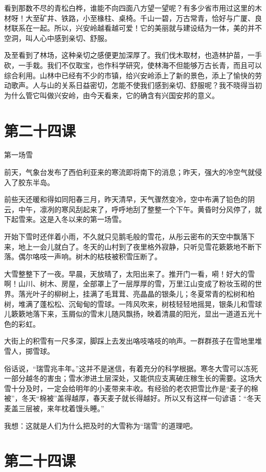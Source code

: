 \documentclass[12pt,UTF8]{ctexbook}
\begin{document}
看到那数不尽的青松白桦，谁能不向四面八方望一望呢？有多少省市用过这里的木材呀！大至矿井、铁路，小至椽柱、桌椅。千山一碧，万古常青，恰好与广厦、良材联系在一起。所以，兴安岭越看越可爱！它的美丽就与建设结为一体，美的并不空洞，叫人心中感到亲切、舒服。

及至看到了林场，这种亲切之感便更加深厚了。我们伐木取材，也造林护苗，一手砍，一手栽。我们不仅取宝，也作科学研究，使林海不但能够万古长青，而且可以综合利用。山林中已经有不少的市镇，给兴安岭添上了新的景色，添上了愉快的劳动歌声。人与山的关系日益密切，怎能不使我们感到亲切、舒服呢？我不晓得当初为什么管它叫做兴安岭，由今天看来，它的确含有兴国安邦的意义。

\section{第二十四课}

第一场雪

前天，气象台发布了西伯利亚来的寒流即将南下的消息；昨天，强大的冷空气就侵入了胶东半岛。

前些天还暖和得如同阳春三月，昨天清早，天气骤然变冷，空中布满了铅色的阴云，中午，凛冽的寒风刮起来了，呼呼地刮了整整一个下午。黄昏时分风停了，就下起雪来。这是入冬以来的第一场雪。

开始下雪时还伴着小雨，不久就只见鹅毛般的雪花，从彤云密布的天空中飘落下来，地上一会儿就白了。冬天的山村到了夜里格外寂静，只听见雪花簌簌地不断下落。偶尔咯吱一声响。树木的枯枝被积雪压断了。

大雪整整下了一夜。早晨，天放晴了，太阳出来了。推开门一看，嗬！好大的雪啊！山川、树木、房屋，全部罩上了一层厚厚的雪，万里江山变成了粉妆玉砌的世界。落光叶子的柳树上，挂满了毛茸茸、亮晶晶的银条儿；冬夏常青的松树和柏树，堆满了蓬松松、沉甸甸的雪球。一阵风吹来，树枝轻轻地摇晃，银条儿和雪球儿簌簌地落下来，玉屑似的雪末儿随风飘扬，映着清晨的阳光，显出一道道五光十色的彩虹。

大街上的积雪有一尺多深，脚踩上去发出咯吱咯吱的响声。一群群孩子在雪地里堆雪人，掷雪球。

俗话说，“瑞雪兆丰年。”这并不是迷信，有着充分的科学根据。寒冬大雪可以冻死一部分越冬的害虫；雪水渗进土层深处，又能供应支离破庄稼生长的需要。这场大雪十分及时，一定会给明年的小麦带来丰收。有经验的老农把雪比作是“麦子的棉被”，冬天“棉被”盖得越厚，春天麦子就长得越好。所以又有这样一句谚语：“冬天麦盖三层被，来年枕着馒头睡。”

我想：这就是人们为什么把及时的大雪称为“瑞雪”的道理吧。

\section{第二十四课}
\end{document}

